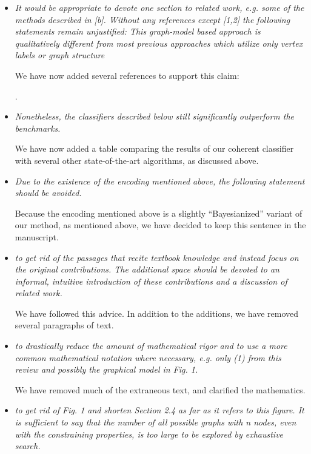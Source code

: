 \begin{itemize}
	\item \emph{It would be appropriate to devote one section to related work, e.g. some of the methods described in [b]. Without any references except [1,2] the following statements remain unjustified: This graph-model based approach is qualitatively different from most previous approaches which utilize only vertex labels or graph structure}

	We have now added several references to support this claim:
	
	.
	
	
	\item \emph{Nonetheless, the classifiers described below still significantly outperform the benchmarks.}
	
	We have now added a table comparing the results of our coherent classifier with several other state-of-the-art algorithms, as discussed above.
	
	\item \emph{Due to the existence of the encoding mentioned above, the following statement should be avoided.}
	
		Because the encoding mentioned above is a slightly ``Bayesianized'' variant of our method, as mentioned above, we have decided to keep this sentence in the manuscript.
		
	\item \emph{to get rid of the passages that recite textbook knowledge and instead focus on the original contributions. The additional space should be devoted to an informal, intuitive introduction of these contributions and a discussion of related work.}
	
	We have followed this advice.  In addition to the additions, we have removed several paragraphs of text.
	
	\item \emph{to drastically reduce the amount of mathematical rigor and to use a more common mathematical notation where necessary, e.g. only (1) from this review and possibly the graphical model in Fig. 1.}
	
	We have removed much of the extraneous text, and clarified the mathematics.
	
	\item \emph{to get rid of Fig. 1 and shorten Section 2.4 as far as it refers to this figure. It is sufficient to say that the number of all possible graphs with n nodes, even with the constraining properties, is too large to be explored by exhaustive search.}
	

\end{itemize}
